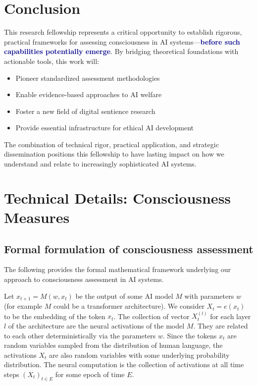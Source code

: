 \documentclass[11pt,a4paper]{article}
\newcommand{\impact}[1]{\textbf{\textcolor{darkblue}{#1}}}
\begin{document}
\section{Conclusion}
\label{sec:conclusion}

This research fellowship represents a critical opportunity to establish rigorous, practical frameworks for assessing consciousness in AI systems—\impact{before such capabilities potentially emerge}. By bridging theoretical foundations with actionable tools, this work will:

\begin{itemize}
    \item Pioneer standardized assessment methodologies
    \item Enable evidence-based approaches to AI welfare
    \item Foster a new field of digital sentience research
    \item Provide essential infrastructure for ethical AI development
\end{itemize}

The combination of technical rigor, practical application, and strategic dissemination positions this fellowship to have lasting impact on how we understand and relate to increasingly sophisticated AI systems.




\appendix

\section{Technical Details: Consciousness Measures}

\subsection{Formal formulation of consciousness assessment}

The following provides the formal mathematical framework underlying our approach to consciousness assessment in AI systems.

Let $x_{t+1} = M(w, x_t)$ be the output of some AI model $M$ with parameters $w$ (for example $M$ could be a transformer architecture). We consider $X_t = e(x_t)$ to be the embedding of the token $x_t$. The collection of vector $X^{(l)}_t$ for each layer $l$ of the architecture are the neural activations of the model $M$. They are related to each other deterministically via the parameters $w$. Since the tokens $x_t$ are random variables sampled from the distribution of human language, the activations $X_t$ are also random variables with some underlying probability distribution. The neural computation is the collection of activations at all time steps $(X_t)_{t\in E}$ for some epoch of time $E$.
\end{document}
